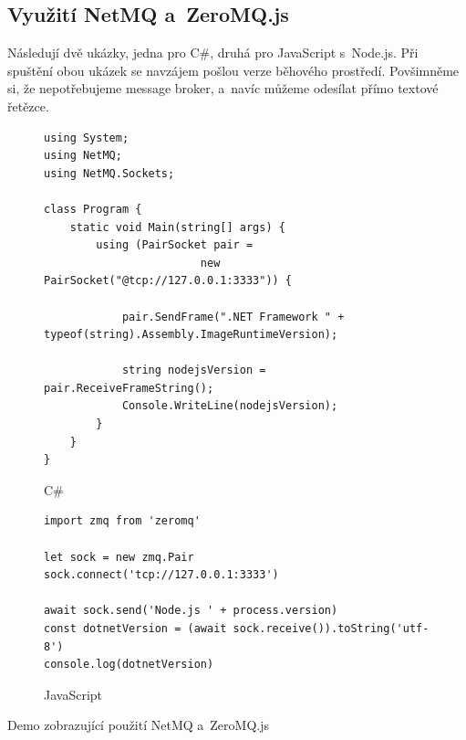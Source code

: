\documentclass[12pt, a4paper, twoside]{article}
\newcommand{\codefigureSpacing}{1.2}
\begin{document}
   \subsection{Využití NetMQ a~ZeroMQ.js}
   \label{sub_sec:zeromqDemo}
    Následují dvě ukázky, jedna pro C\#, druhá pro JavaScript s~Node.js. Při spuštění obou ukázek se navzájem pošlou verze běhového prostředí. Povšimněme si, že nepotřebujeme message broker, a~navíc můžeme odesílat přímo textové řetězce.
\begin{codefigure}[H]
\renewcommand\baselinestretch{\codefigureSpacing}
	\begin{subfigure}[t]{\textwidth}
	\begin{lstlisting}[style=MyCSharp]
using System;
using NetMQ;
using NetMQ.Sockets;

class Program {
	static void Main(string[] args)	{
		using (PairSocket pair = 
						new PairSocket("@tcp://127.0.0.1:3333")) {
							
			pair.SendFrame(".NET Framework " + typeof(string).Assembly.ImageRuntimeVersion);
			
			string nodejsVersion = pair.ReceiveFrameString();
			Console.WriteLine(nodejsVersion);
		}
	}	
}
	\end{lstlisting}
	\caption{C\#}
	\end{subfigure}
\end{codefigure}
   	\begin{codefigure}[H] \ContinuedFloat
   	\renewcommand\baselinestretch{\codefigureSpacing}
   		\begin{subfigure}[t]{\textwidth}
	   	\begin{lstlisting}[style=MyJavaScript]
import zmq from 'zeromq'

let sock = new zmq.Pair
sock.connect('tcp://127.0.0.1:3333')

await sock.send('Node.js ' + process.version)
const dotnetVersion = (await sock.receive()).toString('utf-8')
console.log(dotnetVersion)
       \end{lstlisting}
   \caption{JavaScript}
   \end{subfigure}
	\caption{Demo zobrazující použití NetMQ a~ZeroMQ.js}
   	\end{codefigure}
	\setcounter{secnumdepth}{-2}
	\glsaddallunused
	\pagebreak
	\printglossary[title=Slovníček vybraných pojmů, toctitle=Slovníček vybraných pojmů]
	\label{glossary}
	\newpage
	
	\sectionfont{}
	\listoffigures
	\pagebreak
	\listoftables
	\pagebreak
	\listofcodefigures
	
	
	
	
\end{document}
